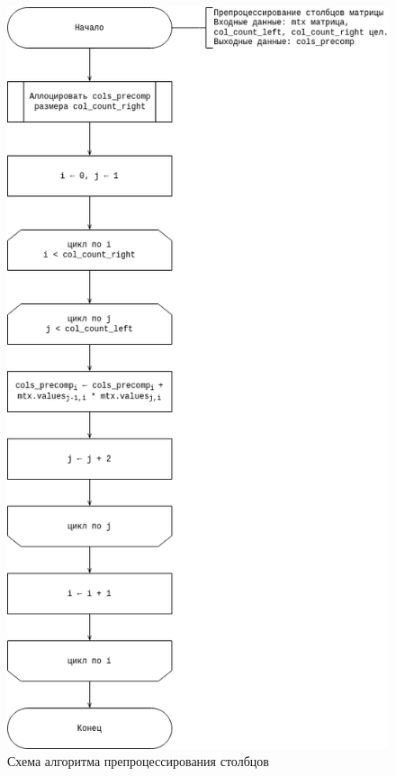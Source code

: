 \begin{figure}[H]
	\centering
	\includegraphics[width=0.7\linewidth]{assets/mtx-predproc-c.drawio.png}
	\caption{Схема алгоритма препроцессирования столбцов}
	\label{fig:prep-c}
\end{figure}

